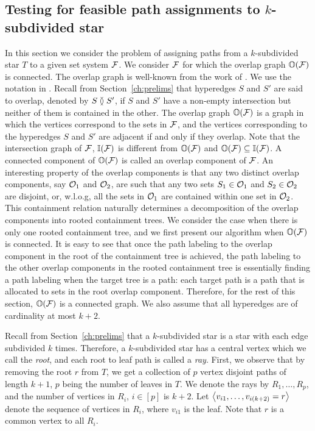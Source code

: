 \documentclass[MS]             %
              {iitmdiss_as}    %
\begin{document}
\subsection{Testing for feasible path assignments to $k$-subdivided star}
\label{sec:ksubdivstar}
In this section we consider the problem of assigning paths from a
$k$-subdivided star $T$ to a given set system ${\cal F}$.  We consider
${\cal F}$ for which the overlap graph $\mathbb O({\cal F})$ is connected.  The
overlap graph is well-known from the work of
\cite{kklv10,nsnrs09,wlh02}.  We use the notation in
\cite{kklv10}. Recall from Section~\ref{ch:prelims} that hyperedges
$S$ and $S'$ are said to overlap, denoted by $S \between S'$, if $S$ and $S'$
have a non-empty intersection but neither of them is contained in the
other. The overlap graph $\mathbb O({\cal F})$ is a graph in which the vertices
correspond to the sets in ${\cal F}$, and the vertices corresponding to the
hyperedges $S$ and $S'$ are adjacent if and only if they overlap.  Note
that the intersection graph of ${\cal F}$, $\mathbb I({\cal F})$ is different from
$\mathbb O({\cal F})$ and $\mathbb O({\cal F}) \subseteq \mathbb I({\cal F})$.  A connected component
of $\mathbb O({\cal F})$ is called an overlap component of ${\cal F}$.  An interesting
property of the overlap components is that any two distinct overlap
components, say ${\cal O}_1$ and ${\cal O}_2$, are such that any two sets $S_1
\in {\cal O}_1$ and $S_2 \in {\cal O}_2$ are disjoint, or, w.l.o.g, all the sets
in ${\cal O}_1$ are contained within one set in ${\cal O}_2$.  This containment
relation naturally determines a decomposition of the overlap
components into rooted containment trees.  We consider the case when
there is only one rooted containment tree, and we first present our
algorithm when $\mathbb O({\cal F})$ is connected.  It is easy to see that once
the path labeling to the overlap component in the root of the
containment tree is achieved, the path labeling to the other overlap
components in the rooted containment tree is essentially finding a
path labeling when the target tree is a path: each target path is a
path that is allocated to sets in the root overlap component.
Therefore, for the rest of this section, $\mathbb O({\cal F})$ is a connected
graph. We also assume that all hyperedges are of cardinality at most
$k+2$.



Recall from Section~\ref{ch:prelims} that a $k$-subdivided star is a
star with each edge subdivided $k$ times.  Therefore, a $k$-subdivided
star has a central vertex which we call the {\em root}, and each root
to leaf path is called a {\em ray}.  First, we observe that by
removing the root $r$ from $T$, we get a collection of $p$ vertex
disjoint paths of length $k+1$, $p$ being the number of leaves in $T$.
We denote the rays by $R_1, \ldots, R_p$, and the number of vertices in
$R_i$, $i \in [p]$ is $k+2$.  Let
$\left\langle v_{i1},\ldots,v_{i(k+2)}=r \right\rangle$ denote the sequence of vertices in
$R_i$, where $v_{i1}$ is the leaf. Note that $r$ is a common vertex to all $R_i$.
  
\end{document}
